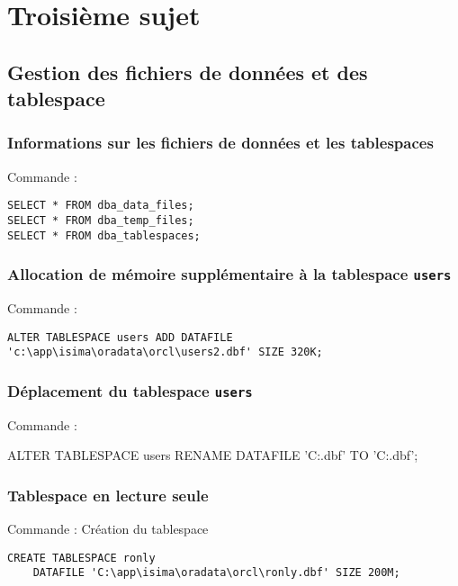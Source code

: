 \section{Troisième sujet}

\subsection{Gestion des fichiers de données et des tablespace}

\subsubsection{Informations sur les fichiers de données et les tablespaces}

Commande :
\begin{verbatim}
SELECT * FROM dba_data_files;
SELECT * FROM dba_temp_files;
SELECT * FROM dba_tablespaces;
\end{verbatim}


\subsubsection{Allocation de mémoire supplémentaire à la tablespace \texttt{users}}

Commande :
\begin{verbatim}
ALTER TABLESPACE users ADD DATAFILE 'c:\app\isima\oradata\orcl\users2.dbf' SIZE 320K;
\end{verbatim}

\subsubsection{Déplacement du tablespace \texttt{users}}

Commande :
\begin{verbatimtab}
ALTER TABLESPACE users 
	RENAME DATAFILE 'C:\app\isima\oradata\orcl\datafile.dbf' TO 'C:\app\isima\oradata\orcl{}\datafile.dbf';
\end{verbatimtab}


\subsubsection{Tablespace en lecture seule}

Commande : Création du tablespace
\begin{verbatim}
CREATE TABLESPACE ronly
	DATAFILE 'C:\app\isima\oradata\orcl\ronly.dbf' SIZE 200M;
\end{verbatim}


